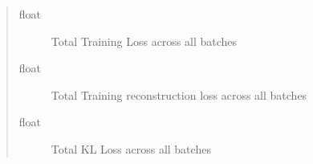 \documentclass[letterpaper,10pt,english]{sphinxmanual}
\begin{document}
\begin{fulllineitems}
\begin{quote}
\begin{description}
\begin{description}
\item[{float}] \leavevmode
Total Training Loss across all batches

\item[{float}] \leavevmode
Total Training reconstruction loss across all batches

\item[{float}] \leavevmode
Total KL Loss across all batches

\end{description}

\end{description}\end{quote}

\end{fulllineitems}

\end{document}
